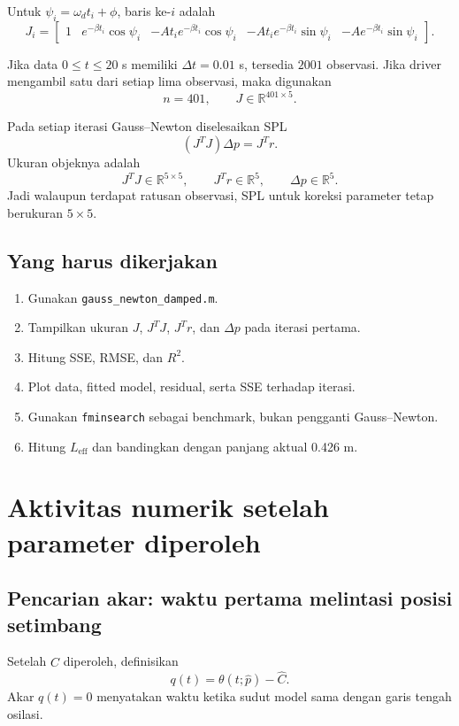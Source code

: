 \documentclass[book,english,noindex,lean,nobackpage,nocopyright,noupdate,nofiglist,notablist]{enacom}
\begin{document}
Untuk $\psi_i=\omega_dt_i+\phi$, baris ke-$i$ adalah
\[
J_i=\begin{bmatrix}
1 & e^{-\beta t_i}\cos\psi_i & -At_i e^{-\beta t_i}\cos\psi_i & -At_i e^{-\beta t_i}\sin\psi_i & -A e^{-\beta t_i}\sin\psi_i
\end{bmatrix}.
\]

Jika data $0\le t\le20$ s memiliki $\Delta t=0.01$ s, tersedia $2001$ observasi. Jika driver mengambil satu dari setiap lima observasi, maka digunakan
\[
n=401,\qquad J\in\mathbb{R}^{401\times5}.
\]

Pada setiap iterasi Gauss--Newton diselesaikan SPL
\begin{equation}
(J^TJ)\Delta p=J^Tr.
\label{eq:p10-gn}
\end{equation}
Ukuran objeknya adalah
\[
J^TJ\in\mathbb{R}^{5\times5},\qquad J^Tr\in\mathbb{R}^{5},\qquad \Delta p\in\mathbb{R}^{5}.
\]
Jadi walaupun terdapat ratusan observasi, SPL untuk koreksi parameter tetap berukuran $5\times5$.

\subsection{Yang harus dikerjakan}
\begin{enumerate}
\item Gunakan \texttt{gauss\_newton\_damped.m}.
\item Tampilkan ukuran $J$, $J^TJ$, $J^Tr$, dan $\Delta p$ pada iterasi pertama.
\item Hitung SSE, RMSE, dan $R^2$.
\item Plot data, fitted model, residual, serta SSE terhadap iterasi.
\item Gunakan \texttt{fminsearch} sebagai benchmark, bukan pengganti Gauss--Newton.
\item Hitung $L_{\mathrm{eff}}$ dan bandingkan dengan panjang aktual 0.426 m.
\end{enumerate}

\section{Aktivitas numerik setelah parameter diperoleh}

\subsection{Pencarian akar: waktu pertama melintasi posisi setimbang}
Setelah $\hat C$ diperoleh, definisikan
\begin{equation}
q(t)=\theta(t;\hat p)-\hat C.
\end{equation}
Akar $q(t)=0$ menyatakan waktu ketika sudut model sama dengan garis tengah osilasi.
\end{document}
